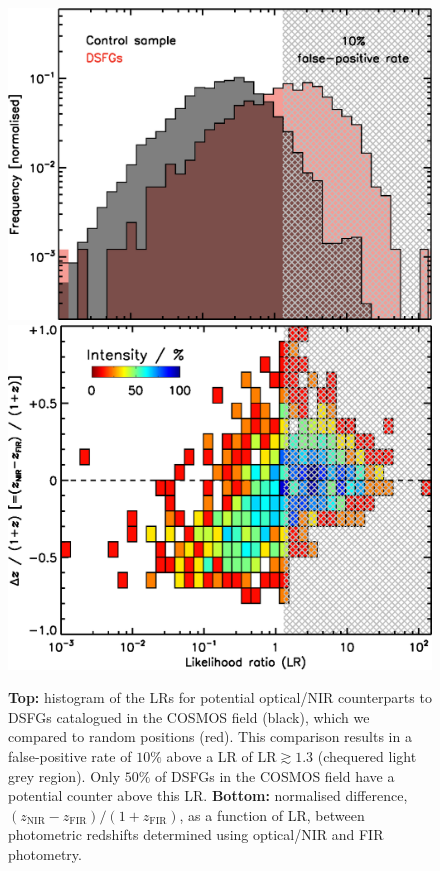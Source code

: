 \documentclass[a4paper, fleqn, usenatbib]{mnras}
\newcommand{\znir}{z_{\text{NIR}}}
\newcommand{\zfir}{z_{\text{FIR}}}
\begin{document}
\begin{figure}
    \hspace{0.25em}\includegraphics[width=0.99\columnwidth]{likelihood_ratio_false_positive}\\
    \includegraphics[width=\columnwidth]{likelihood_ratio}
    \caption{\textbf{Top:} histogram of the LRs for potential optical/NIR counterparts to DSFGs catalogued in the COSMOS field (black), which we compared to random positions (red).
    This comparison results in a false-positive rate of $10\%$ above a LR of $\text{LR}\gtrsim1.3$ (chequered light grey region).
    Only $50\%$ of DSFGs in the COSMOS field have a potential counter above this LR.
    \textbf{Bottom:} normalised difference, $(\znir-\zfir)/(1+\zfir)$, as a function of LR, between photometric redshifts determined using optical/NIR and FIR photometry.
}
\end{figure}
\end{document}
